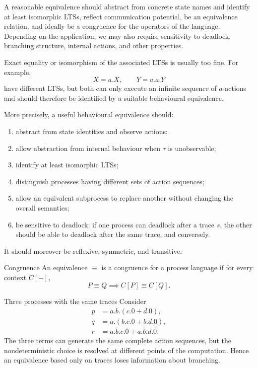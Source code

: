 \documentclass[a4paper]{article}
\begin{document}
A reasonable equivalence should abstract from concrete state names and identify at least isomorphic LTSs, reflect communication potential, be an equivalence relation, and ideally be a congruence for the operators of the language.
Depending on the application, we may also require sensitivity to deadlock, branching structure, internal actions, and other properties.

Exact equality or isomorphism of the associated LTSs is usually too fine.
For example,
\[
    X=a.X,
    \qquad
    Y=a.a.Y
\]
have different LTSs, but both can only execute an infinite sequence of \(a\)-actions and should therefore be identified by a suitable behavioural equivalence.

More precisely, a useful behavioural equivalence should:
\begin{enumerate}
    \item abstract from state identities and observe actions;
    \item allow abstraction from internal behaviour when \(\tau\) is unobservable;
    \item identify at least isomorphic LTSs;
    \item distinguish processes having different sets of action sequences;
    \item allow an equivalent subprocess to replace another without changing the overall semantics;
    \item be sensitive to deadlock: if one process can deadlock after a trace \(s\), the other should be able to deadlock after the same trace, and conversely.
\end{enumerate}
It should moreover be reflexive, symmetric, and transitive.

\begin{snippetdefinition}{Congruence}
    An equivalence \(\equiv\) is a congruence for a process language if for every context \(C[-]\),
    \[
        P\equiv Q
        \implies
        C[P]\equiv C[Q].
    \]
\end{snippetdefinition}

\begin{snippetexample}{Three processes with the same traces}
    Consider
    \begin{align*}
        p&=a.b.(c.0+d.0),\\
        q&=a.(b.c.0+b.d.0),\\
        r&=a.b.c.0+a.b.d.0.
    \end{align*}
    The three terms can generate the same complete action sequences, but the nondeterministic choice is resolved at different points of the computation.
    Hence an equivalence based only on traces loses information about branching.
\end{snippetexample}
\end{document}
